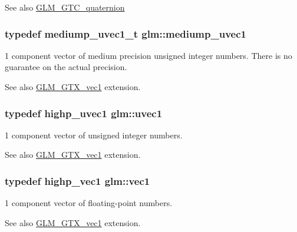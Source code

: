 \begin{DoxySeeAlso}{See also}
\hyperlink{group__gtc__quaternion}{G\+L\+M\+\_\+\+G\+T\+C\+\_\+quaternion} 
\end{DoxySeeAlso}
\subsubsection[{\texorpdfstring{mediump\+\_\+uvec1}{mediump_uvec1}}]{\setlength{\rightskip}{0pt plus 5cm}typedef {\bf mediump\+\_\+uvec1\+\_\+t} {\bf glm\+::mediump\+\_\+uvec1}}\hypertarget{namespaceglm_a1fa5a5fb993ee72b4dc8d2a9caf85b26}{}\label{namespaceglm_a1fa5a5fb993ee72b4dc8d2a9caf85b26}
1 component vector of medium precision unsigned integer numbers. There is no guarantee on the actual precision. \begin{DoxySeeAlso}{See also}
\hyperlink{group__gtx__vec1}{G\+L\+M\+\_\+\+G\+T\+X\+\_\+vec1} extension. 
\end{DoxySeeAlso}
\subsubsection[{\texorpdfstring{uvec1}{uvec1}}]{\setlength{\rightskip}{0pt plus 5cm}typedef {\bf highp\+\_\+uvec1} {\bf glm\+::uvec1}}\hypertarget{namespaceglm_a4e12bc23a3d060164eef452f81d92a03}{}\label{namespaceglm_a4e12bc23a3d060164eef452f81d92a03}
1 component vector of unsigned integer numbers. \begin{DoxySeeAlso}{See also}
\hyperlink{group__gtx__vec1}{G\+L\+M\+\_\+\+G\+T\+X\+\_\+vec1} extension. 
\end{DoxySeeAlso}
\subsubsection[{\texorpdfstring{vec1}{vec1}}]{\setlength{\rightskip}{0pt plus 5cm}typedef {\bf highp\+\_\+vec1} {\bf glm\+::vec1}}\hypertarget{namespaceglm_a16030dae9029ed1eab1553a2183bbb79}{}\label{namespaceglm_a16030dae9029ed1eab1553a2183bbb79}
1 component vector of floating-\/point numbers. \begin{DoxySeeAlso}{See also}
\hyperlink{group__gtx__vec1}{G\+L\+M\+\_\+\+G\+T\+X\+\_\+vec1} extension. 
\end{DoxySeeAlso}

